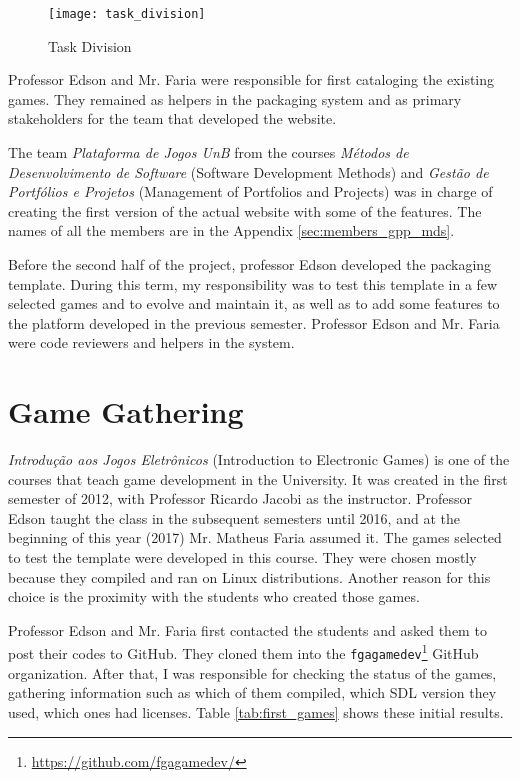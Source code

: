 \begin{figure}[h!]
\centering
\texttt{[image: task\_division]}
\caption{Task Division}
\label{fig:task_division}
\end{figure}

Professor Edson and Mr. Faria were responsible for first cataloging the existing games. They remained as helpers in the packaging system and as primary stakeholders for the team that developed the website.

The team \textit{Plataforma de Jogos UnB} from the courses \textit{Métodos de Desenvolvimento de Software} (Software Development Methods) and \textit{Gestão de Portfólios e Projetos} (Management of Portfolios and Projects) was in charge of creating the first version of the actual website with some of the features. The names of all the members are in the Appendix \ref{sec:members_gpp_mds}.

Before the second half of the project, professor Edson developed the packaging template. During this term, my responsibility was to test this template in a few selected games and to evolve and maintain it, as well as to add some features to the platform developed in the previous semester. Professor Edson and Mr. Faria were code reviewers and helpers in the system.


\section{Game Gathering}
\label{sec:game_gathering}

\textit{Introdução aos Jogos Eletrônicos} (Introduction to Electronic Games) is one of the courses that teach game development in the University. It was created in the first semester of 2012, with Professor Ricardo Jacobi as the instructor. Professor Edson taught the class in the subsequent semesters until 2016, and at the beginning of this year (2017) Mr. Matheus Faria assumed it. The games selected to test the template were developed in this course. They were chosen mostly because they compiled and ran on Linux distributions. Another reason for this choice is the proximity with the students who created those games.

Professor Edson and Mr. Faria first contacted the students and asked them to post their codes to GitHub. They cloned them into the \texttt{fgagamedev}\footnote{ \href{https://github.com/fgagamedev}{https://github.com/fgagamedev/} } GitHub organization. After that, I was responsible for checking the status of the games, gathering information such as which of them compiled, which SDL version they used, which ones had licenses. Table \ref{tab:first_games} shows these initial results.


